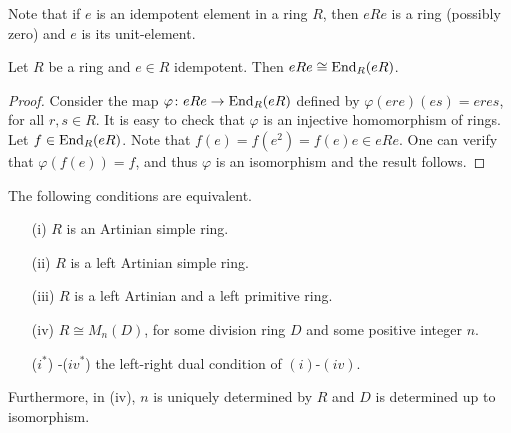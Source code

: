 Note that if $e$ is an idempotent element in a ring $R$, then
$eRe$ is a ring (possibly zero) and $e$ is its unit-element.

\begin{lemma}\label{Lema 1.4.2}
Let $R$ be a ring and $e\in R$ idempotent. Then $eRe\cong
\operatorname{End}_R(eR)$.
\end{lemma}

\begin{proof}
Consider the map $\varphi\colon eRe\rightarrow \operatorname{End}_R(eR)$ defined by  $\varphi
(ere)(es)=eres$, for all $r,s\in R$. It is easy to check that $\varphi$ is an injective homomorphism of rings.
Let $f\in \operatorname{End}_R(eR)$. Note that $f(e)=f(e^2)=f(e)e\in
eRe$. One can verify that $\varphi (f(e))=f$, and thus $\varphi$
is an isomorphism and the result follows.
\end{proof}

\begin{theorem}\label{Teorema 1.4.3}
The following conditions are equivalent.
\begin{itemize}\item[(i)] $R$ is an Artinian simple ring.
\item[(ii)] $R$ is a left Artinian simple ring.
\item[(iii)] $R$ is a left Artinian and a left primitive ring.
\item[(iv)] $R\cong M_n(D)$, for some division ring $D$ and some positive integer $n$.
\item[($i^*$)]-($iv^*$) the left-right dual condition of $(i)$-$(iv)$.
\end{itemize}
Furthermore, in (iv),  $n$ is uniquely determined by $R$ and $D$ is determined up to isomorphism.
\end{theorem}

